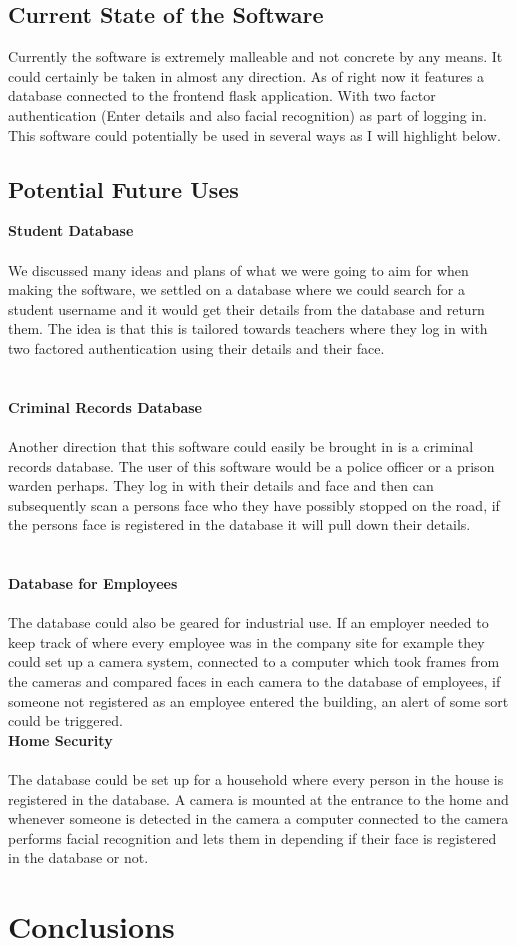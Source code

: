\documentclass{article}
\begin{document}
\subsection{Current State of the Software}
Currently the software is extremely malleable and not concrete by any means. It could certainly be taken in almost any direction. As of right now it features a database connected to the frontend flask application. With two factor authentication (Enter details and also facial recognition) as part of logging in. This software could potentially be used in several ways as I will highlight below.

\subsection{Potential Future Uses}
\textbf{Student Database}\\\\
We discussed many ideas and plans of what we were going to aim for when making the software, we settled on a database where we could search for a student username and it would get their details from the database and return them. The idea is that this is tailored towards teachers where they log in with two factored authentication using their details and their face.
\\\\\\
\textbf{Criminal Records Database}\\\\
Another direction that this software could easily be brought in is a criminal records database. The user of this software would be a police officer or a prison warden perhaps. They log in with their details and face and then can subsequently scan a persons face who they have possibly stopped on the road, if the persons face is registered in the database it will pull down their details.
\\\\\\
\textbf{Database for Employees}\\\\
The database could also be geared for industrial use. If an employer needed to keep track of where every employee was in the company site for example they could set up a camera system, connected to a computer which took frames from the cameras and compared faces in each camera to the database of employees, if someone not registered as an employee entered the building, an alert of some sort could be triggered.
\\\textbf{Home Security}\\\\
The database could be set up for a household where every person in the house is registered in the database. A camera is mounted at the entrance to the home and whenever someone is detected in the camera a computer connected to the camera performs facial recognition and lets them in depending if their face is registered in the database or not.

\newpage

\section{Conclusions}


\newpage
\printbibliography
\end{document}
